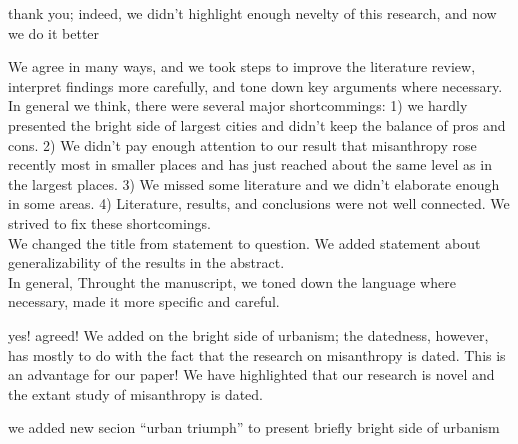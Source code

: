 
thank you; indeed, we didn't highlight enough nevelty of this research, and now we do it better 


We agree in many ways, and we took steps to improve the literature review,
interpret findings more carefully, and tone down key arguments where necessary.\\

In general we think,
there were several major shortcommings: 1) we hardly presented the bright side of
largest cities and didn't keep the balance of pros and cons. 2) We didn't pay enough attention to our result that misanthropy rose recently most in smaller
places and has just reached about the same level as in the largest places. 3) We
missed some literature and we didn't elaborate enough in some areas.
4) Literature, results, and conclusions were not well connected.
 We strived to fix these shortcomings.\\ 
 
 We changed the title from statement to question.
 We added statement about generalizability of the results in the abstract.\\

In general, Throught the manuscript, we toned down the language where necessary, made it more specific and careful.
 

yes! agreed! We added on the bright side of urbanism; the datedness, however, has mostly to do with the fact that the research on misanthropy is dated. This is an advantage for our paper! We have highlighted that our research is novel and the extant study of misanthropy is dated.

we added new secion ``urban triumph'' to present briefly bright side of urbanism 


